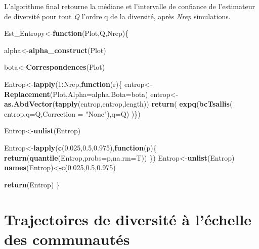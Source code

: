\documentclass[
  11pt,
  french,
  A4paper,
  extrafontsizes,onecolumn,openright
  ]{memoir}
\newenvironment{Shaded}{\begin{snugshade}}{\end{snugshade}}
\newcommand{\KeywordTok}[1]{\textcolor[rgb]{0.13,0.29,0.53}{\textbf{#1}}}
\newcommand{\DataTypeTok}[1]{\textcolor[rgb]{0.13,0.29,0.53}{#1}}
\newcommand{\DecValTok}[1]{\textcolor[rgb]{0.00,0.00,0.81}{#1}}
\newcommand{\FloatTok}[1]{\textcolor[rgb]{0.00,0.00,0.81}{#1}}
\newcommand{\StringTok}[1]{\textcolor[rgb]{0.31,0.60,0.02}{#1}}
\newcommand{\ControlFlowTok}[1]{\textcolor[rgb]{0.13,0.29,0.53}{\textbf{#1}}}
\newcommand{\OperatorTok}[1]{\textcolor[rgb]{0.81,0.36,0.00}{\textbf{#1}}}
\newcommand{\NormalTok}[1]{#1}
\begin{document}
L'algorithme final retourne la médiane et l'intervalle de confiance de
l'estimateur de diversité pour tout \emph{Q} l'ordre q de la diversité,
après \emph{Nrep} simulations.

\begin{Shaded}
\begin{Highlighting}[]
\NormalTok{Est_Entropy<-}\ControlFlowTok{function}\NormalTok{(Plot,Q,Nrep)\{}
  
\NormalTok{  alpha<-}\KeywordTok{alpha_construct}\NormalTok{(Plot)}
  
\NormalTok{  bota<-}\KeywordTok{Correspondences}\NormalTok{(Plot)}
  
\NormalTok{  Entrop<-}\KeywordTok{lapply}\NormalTok{(}\DecValTok{1}\OperatorTok{:}\NormalTok{Nrep,}\ControlFlowTok{function}\NormalTok{(r)\{}
\NormalTok{    entrop<-}
\StringTok{      }\KeywordTok{Replacement}\NormalTok{(Plot,}\DataTypeTok{Alpha=}\NormalTok{alpha,}\DataTypeTok{Bota=}\NormalTok{bota)}
\NormalTok{    entrop<-}
\StringTok{      }\KeywordTok{as.AbdVector}\NormalTok{(}\KeywordTok{tapply}\NormalTok{(entrop,entrop,length))}
    \KeywordTok{return}\NormalTok{(}
      \KeywordTok{expq}\NormalTok{(}\KeywordTok{bcTsallis}\NormalTok{(}
\NormalTok{        entrop,}\DataTypeTok{q=}\NormalTok{Q,}\DataTypeTok{Correction =} \StringTok{"None"}\NormalTok{),}\DataTypeTok{q=}\NormalTok{Q)}
\NormalTok{      )\})}
  
\NormalTok{  Entrop<-}\KeywordTok{unlist}\NormalTok{(Entrop)}
  
\NormalTok{  Entrop<-}\KeywordTok{lapply}\NormalTok{(}\KeywordTok{c}\NormalTok{(}\FloatTok{0.025}\NormalTok{,}\FloatTok{0.5}\NormalTok{,}\FloatTok{0.975}\NormalTok{),}\ControlFlowTok{function}\NormalTok{(p)\{}
    \KeywordTok{return}\NormalTok{(}\KeywordTok{quantile}\NormalTok{(Entrop,}\DataTypeTok{probs=}\NormalTok{p,}\DataTypeTok{na.rm=}\NormalTok{T))}
\NormalTok{  \})}
\NormalTok{  Entrop<-}\KeywordTok{unlist}\NormalTok{(Entrop)}
  \KeywordTok{names}\NormalTok{(Entrop)<-}\KeywordTok{c}\NormalTok{(}\FloatTok{0.025}\NormalTok{,}\FloatTok{0.5}\NormalTok{,}\FloatTok{0.975}\NormalTok{)}
  
  \KeywordTok{return}\NormalTok{(Entrop)}
\NormalTok{\}}
\end{Highlighting}
\end{Shaded}

\chapter{Trajectoires de diversité à l'échelle des
communautés}\label{trajectoires-de-diversite-a-lechelle-des-communautes}
\end{document}
